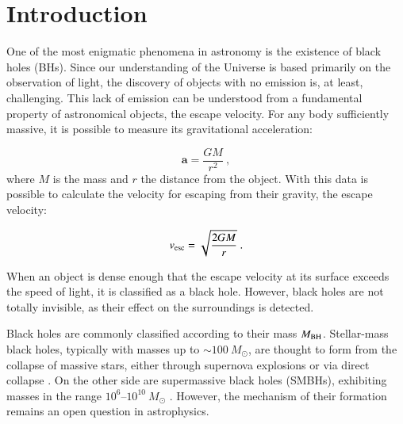 %
%

\chapter{Introduction}
\label{cap:1_Introduction}

One of the most enigmatic phenomena in astronomy is the existence of black holes (BHs). Since our understanding of the Universe is based primarily on the observation of light, the discovery of objects with no emission is, at least, challenging. This lack of emission can be understood from a fundamental property of astronomical objects, the escape velocity. For any body sufficiently massive, it is possible to measure its gravitational acceleration:

\begin{equation}
	\mathbf{a}=\frac{GM}{r^2}~,
\end{equation}
where $M$ is the mass and $r$ the distance from the object. With this data is possible to calculate the velocity for escaping from their gravity, the escape velocity:

\begin{equation}
	v_{\rm esc} = \sqrt{\frac{2GM}{r}}~.
\end{equation}

When an object is dense enough that the escape velocity at its surface exceeds the speed of light, it is classified as a black hole. However, black holes are not totally invisible, as their effect on the surroundings is detected.

Black holes are commonly classified according to their mass $M_{\rm BH}$. Stellar-mass black holes, typically with masses up to $\sim 100~M_{\odot}$, are thought to form from the collapse of massive stars, either through supernova explosions or via direct collapse \citep{belczynski2010maximum,o2011black}. On the other side are supermassive black holes (SMBHs), exhibiting masses in the range $10^6$--$10^{10}~M_{\odot}$ \citep{natarajan2009there,woods2019titans}. However, the mechanism of their formation remains an open question in astrophysics.


